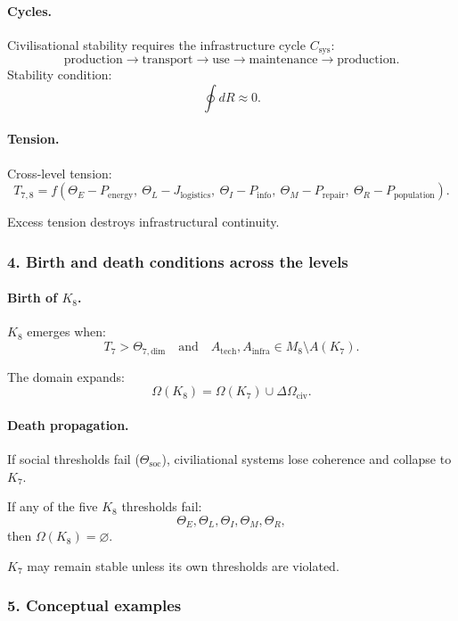 \paragraph{Cycles.}
Civilisational stability requires the infrastructure cycle $C_{\mathrm{sys}}$:
\[
\text{production} \rightarrow \text{transport} \rightarrow
\text{use} \rightarrow \text{maintenance} \rightarrow \text{production}.
\]
Stability condition:
\[
\oint dR \approx 0.
\]

\paragraph{Tension.}
Cross-level tension:
\[
T_{7,8} =
f(\Theta_E - P_{\mathrm{energy}},\ 
  \Theta_L - J_{\mathrm{logistics}},\ 
  \Theta_I - P_{\mathrm{info}},\ 
  \Theta_M - P_{\mathrm{repair}},\
  \Theta_R - P_{\mathrm{population}}).
\]

Excess tension destroys infrastructural continuity.

\subsubsection{4. Birth and death conditions across the levels}

\paragraph{Birth of \texorpdfstring{$K_8$}{K_8}.}
$K_8$ emerges when:
\[
T_7 > \Theta_{7,\mathrm{dim}}
\quad\text{and}\quad
A_{\mathrm{tech}}, A_{\mathrm{infra}} \in M_8 \setminus A(K_7).
\]

The domain expands:
\[
\Omega(K_8) = \Omega(K_7) \cup \Delta\Omega_{\mathrm{civ}}.
\]

\paragraph{Death propagation.}
If social thresholds fail ($\Theta_{\mathrm{soc}}$), civiliational systems lose
coherence and collapse to $K_7$.

If any of the five $K_8$ thresholds fail:
\[
\Theta_E,\Theta_L,\Theta_I,\Theta_M,\Theta_R,
\]
then $\Omega(K_8)=\varnothing$.

$K_7$ may remain stable unless its own thresholds are violated.

\subsubsection{5. Conceptual examples}

